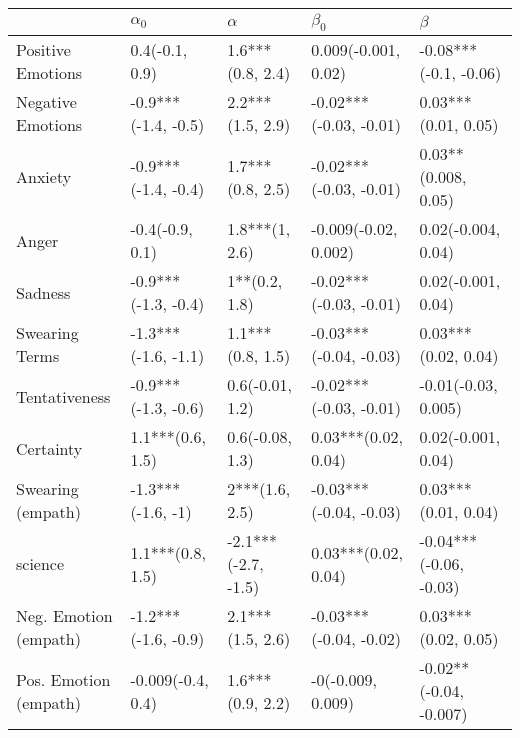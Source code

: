\begin{tabular}{lllll}
\toprule
{} &           $\alpha_0$ &             $\alpha$ &               $\beta_0$ &                 $\beta$ \\
\midrule
Positive Emotions     &       0.4(-0.1, 0.9) &     1.6***(0.8, 2.4) &     0.009(-0.001, 0.02) &   -0.08***(-0.1, -0.06) \\
Negative Emotions     &  -0.9***(-1.4, -0.5) &     2.2***(1.5, 2.9) &  -0.02***(-0.03, -0.01) &     0.03***(0.01, 0.05) \\
Anxiety               &  -0.9***(-1.4, -0.4) &     1.7***(0.8, 2.5) &  -0.02***(-0.03, -0.01) &     0.03**(0.008, 0.05) \\
Anger                 &      -0.4(-0.9, 0.1) &       1.8***(1, 2.6) &    -0.009(-0.02, 0.002) &      0.02(-0.004, 0.04) \\
Sadness               &  -0.9***(-1.3, -0.4) &        1**(0.2, 1.8) &  -0.02***(-0.03, -0.01) &      0.02(-0.001, 0.04) \\
Swearing Terms        &  -1.3***(-1.6, -1.1) &     1.1***(0.8, 1.5) &  -0.03***(-0.04, -0.03) &     0.03***(0.02, 0.04) \\
Tentativeness         &  -0.9***(-1.3, -0.6) &      0.6(-0.01, 1.2) &  -0.02***(-0.03, -0.01) &     -0.01(-0.03, 0.005) \\
Certainty             &     1.1***(0.6, 1.5) &      0.6(-0.08, 1.3) &     0.03***(0.02, 0.04) &      0.02(-0.001, 0.04) \\
Swearing (empath)     &    -1.3***(-1.6, -1) &       2***(1.6, 2.5) &  -0.03***(-0.04, -0.03) &     0.03***(0.01, 0.04) \\
science               &     1.1***(0.8, 1.5) &  -2.1***(-2.7, -1.5) &     0.03***(0.02, 0.04) &  -0.04***(-0.06, -0.03) \\
Neg. Emotion (empath) &  -1.2***(-1.6, -0.9) &     2.1***(1.5, 2.6) &  -0.03***(-0.04, -0.02) &     0.03***(0.02, 0.05) \\
Pos. Emotion (empath) &    -0.009(-0.4, 0.4) &     1.6***(0.9, 2.2) &       -0(-0.009, 0.009) &  -0.02**(-0.04, -0.007) \\
\bottomrule
\end{tabular}
